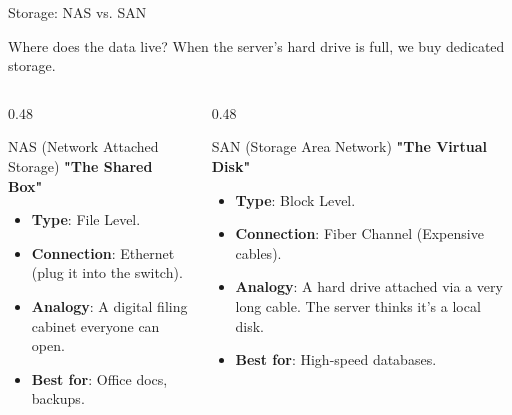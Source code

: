 \documentclass[aspectratio=169]{beamer}  %
\begin{document}
\begin{frame}{Storage: NAS vs. SAN}
    \begin{block}{Where does the data live?}
        \small
        When the server's hard drive is full, we buy dedicated storage.
    \end{block}
    
    \begin{columns}[T]
        \begin{column}{0.48\textwidth}
            \begin{block}{NAS (Network Attached Storage)}
                \footnotesize
                \textbf{"The Shared Box"}
                \begin{itemize}
                    \item \textbf{Type}: File Level.
                    \item \textbf{Connection}: Ethernet (plug it into the switch).
                    \item \textbf{Analogy}: A digital filing cabinet everyone can open.
                    \item \textbf{Best for}: Office docs, backups.
                \end{itemize}
            \end{block}
        \end{column}
        \begin{column}{0.48\textwidth}
            \begin{block}{SAN (Storage Area Network)}
                \footnotesize
                \textbf{"The Virtual Disk"}
                \begin{itemize}
                    \item \textbf{Type}: Block Level.
                    \item \textbf{Connection}: Fiber Channel (Expensive cables).
                    \item \textbf{Analogy}: A hard drive attached via a very long cable. The server thinks it's a local disk.
                    \item \textbf{Best for}: High-speed databases.
                \end{itemize}
            \end{block}
        \end{column}
    \end{columns}
\end{frame}
\end{document}
